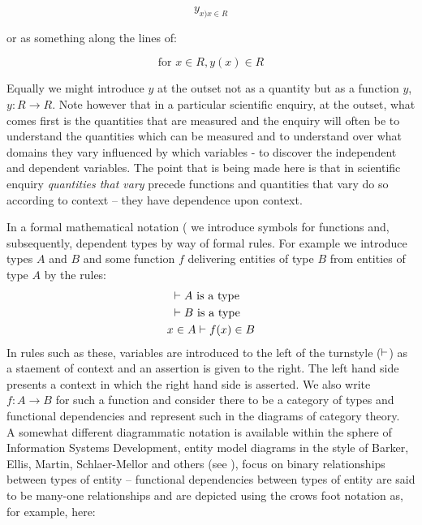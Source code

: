 \documentclass[10pt,a4paper]{scrartcl}
\begin{document}
\begin{equation*}
y_{x)x\in R}
\end{equation*}

\noindent or as something along the lines of:

\begin{equation*}
\text{for } x \in R,  y(x) \in R
\end{equation*}

\noindent Equally we might introduce $y$ at the outset not as a quantity but as a function $y$, $y: R \rightarrow R$. Note however that in a particular scientific enquiry, at the outset, what comes first is the quantities that are measured and the enquiry will often be to understand the quantities which can be measured and to understand over what domains they vary influenced by which variables - to discover the independent and dependent variables.
The point that is being made here is that in scientific enquiry \textit{quantities that vary} precede functions and quantities that vary do so according to context -- they have dependence upon context.

\noindent In a formal mathematical notation (\cite{Cartmell86} we introduce symbols for functions and, subsequently, dependent types by way of formal rules. For example we 
introduce types $A$ and $B$ and some function $f$ delivering entities of type $B$ from entities of type $A$ by the rules:
\begin{align}
&\text{                                  }\vdash A\mbox{ is a type} \\
&\text{                                  }\vdash B\mbox{ is a type} \\
&x \in A \vdash f(x) \in B 
\end{align}
\noindent In rules such as these, variables are introduced to the left of the turnstyle ($\vdash$) as a staement of context and 
an assertion is given to the right. The left hand side presents a context in which the right hand side is asserted. 
We also write $f: A \rightarrow B$ for such a function and consider there to be a category of types and functional dependencies and represent such in the diagrams of category theory. \\

\noindent
A somewhat different diagrammatic notation is available within the sphere of Information Systems Development,  entity model diagrams in the style of Barker, Ellis, Martin, Schlaer-Mellor and others (see \cite{Rock-Evans1989}), focus  on binary relationships between types of entity --
functional dependencies between types of entity are said to be many-one relationships and are depicted using the crows foot notation as, for example, here:
\end{document}
